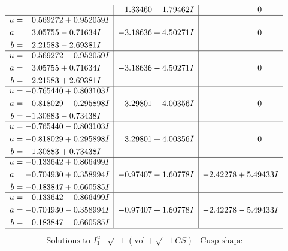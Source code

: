 \documentclass[1p]{elsarticle_modified}
\theoremstyle{definition}
\newcommand{\I}{\sqrt{-1}}
\begin{document}
$$\begin{array}{c|c|c}
 & \phantom{-}1.33460 + 1.79462 I & \phantom{-0.000000 } 0 \\ \hline\begin{aligned}
u &= \phantom{-}0.569272 + 0.952059 I \\
a &= \phantom{-}3.05755 - 0.71634 I \\
b &= \phantom{-}2.21583 - 2.69381 I\end{aligned}
 & -3.18636 + 4.50271 I & \phantom{-0.000000 } 0 \\ \hline\begin{aligned}
u &= \phantom{-}0.569272 - 0.952059 I \\
a &= \phantom{-}3.05755 + 0.71634 I \\
b &= \phantom{-}2.21583 + 2.69381 I\end{aligned}
 & -3.18636 - 4.50271 I & \phantom{-0.000000 } 0 \\ \hline\begin{aligned}
u &= -0.765440 + 0.803103 I \\
a &= -0.818029 - 0.295898 I \\
b &= -1.30883 - 0.73438 I\end{aligned}
 & \phantom{-}3.29801 - 4.00356 I & \phantom{-0.000000 } 0 \\ \hline\begin{aligned}
u &= -0.765440 - 0.803103 I \\
a &= -0.818029 + 0.295898 I \\
b &= -1.30883 + 0.73438 I\end{aligned}
 & \phantom{-}3.29801 + 4.00356 I & \phantom{-0.000000 } 0 \\ \hline\begin{aligned}
u &= -0.133642 + 0.866499 I \\
a &= -0.704930 + 0.358994 I \\
b &= -0.183847 + 0.660585 I\end{aligned}
 & -0.97407 - 1.60778 I & -2.42278 + 5.49433 I \\ \hline\begin{aligned}
u &= -0.133642 - 0.866499 I \\
a &= -0.704930 - 0.358994 I \\
b &= -0.183847 - 0.660585 I\end{aligned}
 & -0.97407 + 1.60778 I & -2.42278 - 5.49433 I\\
 \hline 
 \end{array}$$\newpage$$\begin{array}{c|c|c}  
\text{Solutions to }I^u_{1}& \I (\text{vol} + \sqrt{-1}CS) & \text{Cusp shape}\\

\end{array}$$
\end{document}
